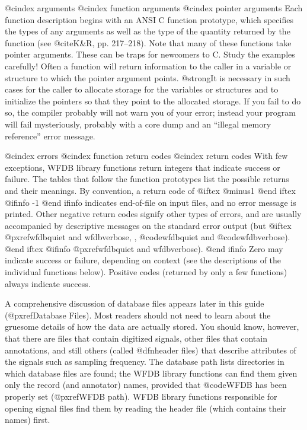 {{{{{{{{{@cindex arguments
@cindex function arguments
@cindex pointer arguments
Each function description begins with an ANSI C function prototype, which
specifies the types of any arguments as well as the type of the quantity
returned by the function (see @cite{K&R}, pp. 217--218).  Note that many
of these functions take pointer arguments.  These can be traps for
newcomers to C.  Study the examples carefully!  Often a function will
return information to the caller in a variable or structure to which the
pointer argument points.  @strong{It is necessary in such cases for the
caller to allocate storage for the variables or structures and to
initialize the pointers so that they point to the allocated storage.  If
you fail to do so, the compiler probably will not warn you of your
error; instead your program will fail mysteriously, probably with a core
dump and an ``illegal memory reference'' error message.}

@cindex errors
@cindex function return codes
@cindex return codes
With few exceptions, WFDB library functions return integers that indicate
success or failure.  The tables that follow the function prototypes
list the possible returns and their meanings.  By convention, a
return code of
@iftex
@minus{}1
@end iftex
@ifinfo
-1
@end ifinfo
indicates end-of-file on input files, and no
error message is printed.  Other negative return codes signify other
types of errors, and are usually accompanied by descriptive messages on
the standard error output (but
@iftex
@pxref{wfdbquiet and wfdbverbose, , @code{wfdbquiet} and @code{wfdbverbose}}).
@end iftex
@ifinfo
@pxref{wfdbquiet and wfdbverbose}).
@end ifinfo
Zero may indicate success or failure, depending on context (see the
descriptions of the individual functions below).  Positive codes
(returned by only a few functions) always indicate success.

A comprehensive discussion of database files appears later in this guide
(@pxref{Database Files}).  Most readers should not need to learn about
the gruesome details of how the data are actually stored.  You should
know, however, that there are files that contain digitized signals,
other files that contain annotations, and still others (called
@dfn{header} files) that describe attributes of the signals such as
sampling frequency.  The database path lists directories in which
database files are found; the WFDB library functions can find them given
only the record (and annotator) names, provided that @code{WFDB} has been
properly set (@pxref{WFDB path}).  WFDB library functions responsible for
opening signal files find them by reading the header file (which
contains their names) first.

}}}}}}}}}
